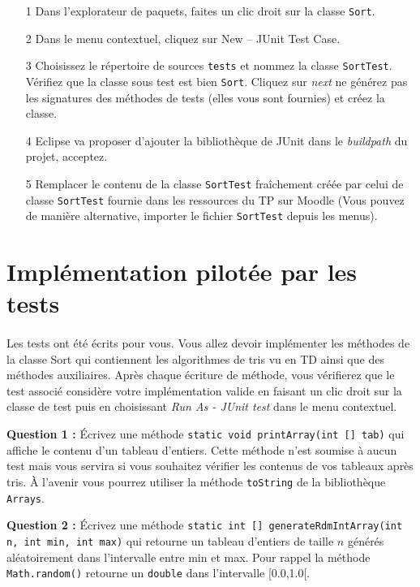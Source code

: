 \documentclass[iutinfo,a4paper,10pt]{ustl-tdtp}
\begin{document}
\begin{itemize}
\item[1] Dans l'explorateur de paquets, faites un clic droit sur la classe \texttt{Sort}.
\item[2] Dans le menu contextuel, cliquez sur New – JUnit Test Case.
\item[3] Choisissez le répertoire de sources \texttt{tests} et nommez la classe \texttt{SortTest}. Vérifiez que la classe sous test est bien \texttt{Sort}. Cliquez sur \textit{next} ne générez pas les signatures des méthodes de tests (elles vous sont fournies) et créez la classe.
\item[4] Eclipse va proposer d'ajouter la bibliothèque de JUnit dans le \textit{buildpath} du projet, acceptez.
\item[5] Remplacer le contenu de la classe \texttt{SortTest} fraîchement créée par celui de classe \texttt{SortTest} fournie dans les ressources du TP sur Moodle (Vous pouvez de manière alternative, importer le fichier \texttt{SortTest} depuis les menus).
\end{itemize}


\section{Implémentation pilotée par les tests}
\paragraph{}
Les tests ont été écrits pour vous. Vous allez devoir implémenter les méthodes de la classe Sort qui contiennent les algorithmes de tris vu en TD ainsi que des méthodes auxiliaires. Après chaque écriture de méthode, vous vérifierez que le test associé considère votre implémentation valide en faisant un clic droit sur la classe de test puis en choisissant  \textit{Run As - JUnit test} dans le menu contextuel. \newline



\textbf{Question 1 : }\newline
Écrivez une méthode \texttt{static void printArray(int [] tab)} qui affiche le contenu d'un tableau d'entiers. Cette méthode n'est soumise à aucun test mais vous servira si vous souhaitez vérifier les contenus de vos tableaux après tris. À l'avenir vous pourrez utiliser la méthode \texttt{toString} de la bibliothèque \texttt{Arrays}. \newline


\textbf{Question 2 : }\newline
Écrivez une méthode \texttt{static int [] generateRdmIntArray(int n, int min, int max)} qui retourne un tableau d'entiers de taille $n$ générés aléatoirement dans l'intervalle entre min et max. Pour rappel la méthode \texttt{Math.random()} retourne un \texttt{double} dans l'intervalle [0.0,1.0[.
\newline
\end{document}
